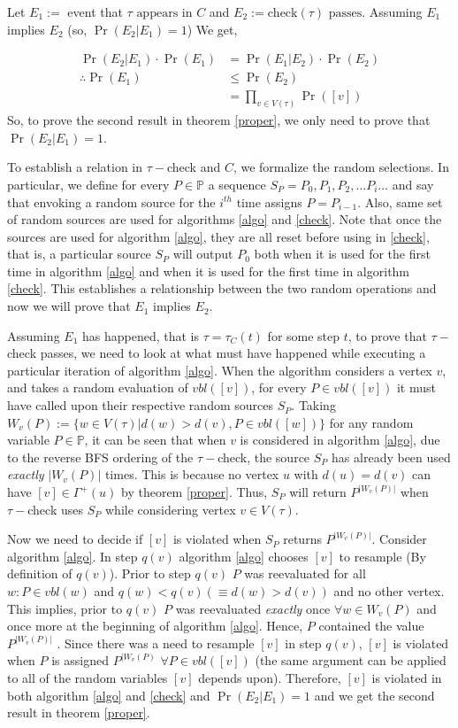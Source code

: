 Let $E_1 :=$ event that $\tau\text{ appears in }C$ and $E_2 := \text{check}(\tau) \text{ passes}$. Assuming $E_1$ implies $E_2$ (so, $\Pr(E_2|E_1)=1$) We get,

\begin{align*}
 \Pr(E_2 | E_1)\cdot \Pr(E_1) & = \Pr(E_1|E_2)\cdot\Pr(E_2)\\
 \therefore\Pr(E_1) & \leq \Pr(E_2) \\
 & = \prod_{v\in V(\tau) }\Pr([v]) 
\end{align*}
So, to prove the second result in theorem \ref{proper}, we only need to prove that $\Pr(E_2|E_1) = 1$.

To establish a relation in $\tau-$check and $C$, we formalize the random selections. In particular, we define for every $P\in\mathbb{P}$ a sequence $S_P = P_0, P_1, P_2, \ldots P_i \ldots $ and say that envoking a random source for the $i^{th}$ time assigns $P=P_{i-1}$. Also, same set of random sources are used for algorithms \ref{algo} and \ref{check}. Note that once the sources are used for algorithm \ref{algo}, they are all reset before using in \ref{check}, that is, a particular source $S_P$ will output $P_0$ both when it is used for the first time in algorithm \ref{algo} and when it is used for the first time in algorithm \ref{check}. This establishes a relationship between the two random operations and now we will prove that $E_1$ implies $E_2$.

Assuming $E_1$ has happened, that is $\tau = \tau_C(t)$ for some step $t$, to prove that $\tau-$check passes, we need to look at what must have happened while executing a particular iteration of algorithm \ref{algo}. When the algorithm considers a vertex $v$, and takes a random evaluation of $vbl([v])$, for every $P\in vbl([v])$ it must have called upon their respective random sources $S_P$. Taking $ W_v(P):=\{w\in V(\tau)|d(w)>d(v),P\in vbl([w]) \} $ for any random variable $P\in \mathbb{P}$, it can be seen that when $v$ is considered in algorithm \ref{algo}, due to the reverse BFS ordering of the $\tau-$check, the source $S_P$ has already been used \emph{exactly} $|W_v(P)|$ times. This is because no vertex $u$ with $d(u)=d(v) $ can have $[v]\in\Gamma^+(u) $ by theorem \ref{proper}. Thus, $S_P$ will return $P^{|W_v(P)|} $ when $\tau-$check uses $S_P$ while considering vertex $v\in V(\tau)$.

Now we need to decide if $[v]$ is violated when $S_P$ returns $P^{|W_v(P)|} $. Consider algorithm \ref{algo}. In step $q(v)$ algorithm \ref{algo} chooses $[v] $ to resample (By definition of $q(v)$).  Prior to step $q(v)$ $P$ was  reevaluated for all $w : P\in vbl(w) $ and $q(w)<q(v) (\equiv d(w)>d(v))$ and no other vertex. This implies, prior to $q(v)$ $ P $ was reevaluated \emph{exactly}  once $\forall w\in W_v(P)$ and once more at the beginning of algorithm \ref{algo}. Hence, $P$ contained the value $P^{|W_v(P)|} $ . Since there was a need to resample $[v]$ in step $q(v)$, $[v]$ is violated when $P$ is assigned $P^{|W_v(P)} \,\, \forall P\in vbl([v]) $ (the same argument can be applied to all of the random variables $[v]$ depends upon). Therefore, $[v]$ is violated in both algorithm \ref{algo} and \ref{check} and $\Pr(E_2|E_1) = 1 $ and we get the second result in theorem \ref{proper}.

